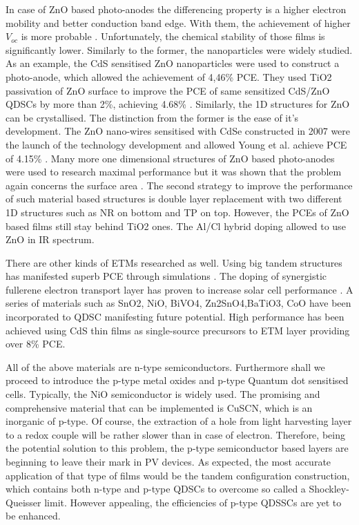 \begin{enumerate}
In case of ZnO based photo-anodes the differencing property is a higher electron mobility and better conduction band edge. With them, the achievement of higher $V_{oc}$  is more probable \cite{X.Gao2017} . Unfortunately, the chemical stability of those films is significantly lower. Similarly to the former, the nanoparticles were widely studied. \cite{L.Lv2014a} As an example, the CdS sensitised ZnO nanoparticles were used to construct a photo-anode, which allowed the achievement of 4,46\% PCE. They used TiO2 passivation of ZnO surface to improve the PCE of same sensitized CdS/ZnO QDSCs by more than 2\%, achieving 4.68\% \cite{Zhang2013b}. Similarly, the 1D structures for ZnO can be crystallised. The distinction from the former is the ease of it's development. The ZnO nano-wires sensitised with CdSe constructed in 2007 were the launch of the technology development and allowed Young et al. achieve PCE of 4.15\% \cite{J.Qiu2013}. Many more one dimensional structures of ZnO based photo-anodes were used to research maximal performance but it was shown that the problem again concerns the surface area \cite{Gonzalez-Pedro2015}. The second strategy to improve the performance of such material based structures is double layer replacement with two different 1D structures such as NR on bottom and TP on top.  However, the PCEs of ZnO based films still stay behind TiO2 ones.\cite{Zhang2013b}  The Al/Cl hybrid doping allowed to use ZnO in IR spectrum.

There are other kinds of ETMs researched as well.  Using big tandem structures has manifested superb PCE through simulations \cite{GregoryF.Pach2017}. The doping of synergistic fullerene electron transport layer has proven to increase solar cell performance \cite{OleksandrVoznyy2014} . A series of materials such as SnO2, NiO, BiVO4, Zn2SnO4,BaTiO3, CoO have been incorporated to QDSC manifesting future potential. High performance has been achieved using CdS thin films as single-source precursors to ETM layer providing over 8\% PCE. \cite{RobertJ.Patterson2017}

All of the above materials are n-type semiconductors. Furthermore shall we proceed to introduce the p-type metal oxides and p-type Quantum dot sensitised cells. Typically, the NiO semiconductor is widely used. The promising and comprehensive material that can be implemented is CuSCN, which is an inorganic of p-type. Of course, the extraction of a hole from light harvesting layer to a redox couple will be rather slower than in case of electron. Therefore, being the potential solution to this problem, the p-type semiconductor based layers are beginning to leave their mark in PV devices. As expected, the most accurate application of that type of films would be the tandem configuration construction, which contains both n-type and p-type QDSCs to overcome so called  a Shockley-Queisser limit. However appealing, the efficiencies of p-type QDSSCs are yet to be enhanced.


\end{enumerate}
